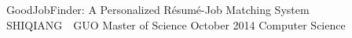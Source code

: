 \maketitlepage
{GoodJobFinder: A Personalized R\'esum\'e-Job Matching System
}   %
{SHIQIANG~~GUO}%
{Master of Science}                %
{October 2014}%
{Computer Science}         %
